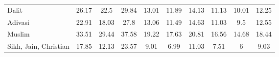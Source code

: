 \begin{tabular}{l*{9}{c}}
Dalit               &       26.17&        22.5&       29.84&       13.01&       11.89&       14.13&       11.13&       10.01&       12.25\\
Adivasi             &       22.91&       18.03&        27.8&       13.06&       11.49&       14.63&       11.03&         9.5&       12.55\\
Muslim              &       33.51&       29.44&       37.58&       19.22&       17.63&       20.81&       16.56&       14.68&       18.44\\
Sikh, Jain, Christian&       17.85&       12.13&       23.57&        9.01&        6.99&       11.03&        7.51&           6&        9.03\\
\bottomrule
\end{tabular}
